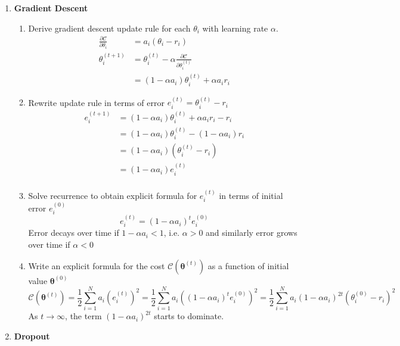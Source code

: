 \documentclass[11pt]{article}
\begin{document}
\newcommand{\bt}{\boldsymbol{\theta}}
\renewcommand{\E}[1]{\mathbb{E}\left\{#1\right\}}
\newcommand{\var}[1]{var\left\{#1\right\}}
\newcommand{\bx}{\mathbf{x}}
\newcommand{\bw}{\mathbf{w}}


\begin{enumerate}
\item \textbf{Gradient Descent}
\begin{enumerate}
    \item Derive gradient descent update rule for each $\theta_i$ with learning rate $\alpha$. 
    \begin{align*}
        \frac{\partial \mathcal{C}}{\partial \theta_i} &= a_i (\theta_i - r_i) \\
        \theta_i^{(t+1)} 
        &= \theta_i^{(t)} - \alpha \frac{\partial \mathcal{C}}{\partial \theta_i^{(t)}} \\
        &= (1-\alpha a_i)\theta_i^{(t)} + \alpha a_i r_i    
    \end{align*}
    \item Rewrite update rule in terms of error $e_i^{(t)} = \theta_i^{(t)} - r_i$
    \begin{align*}
        e_i^{(t+1)} &= (1-\alpha a_i)\theta_i^{(t)} + \alpha a_i r_i - r_i \\ 
        &= (1-\alpha a_i)\theta_i^{(t)} - (1-\alpha a_i)r_i \\
        &= (1-\alpha a_i)(\theta_i^{(t)} - r_i) \\
        &= (1-\alpha a_i) e_i^{(t)} \\ 
    \end{align*}
    \item Solve recurrence to obtain explicit formula for $e_i^{(t)}$ in terms of initial error $e_i^{(0)}$
    \[
        e_i^{(t)} = (1-\alpha a_i)^t e_i^{(0)}
    \]
    Error decays over time if $1-\alpha a_i < 1$, i.e. $\alpha > 0$ and similarly error grows over time if $\alpha < 0$ 
    \item Write an explicit formula for the cost $\mathcal{C}(\bt^{(t)})$ as a function of initial value $\bt^{(0)}$
    \[
        \mathcal{C}(\bt^{(t)}) 
        = \frac{1}{2}\sum_{i=1}^N a_i \left( e_i^{(t)} \right)^2
        = \frac{1}{2}\sum_{i=1}^N a_i \left( (1-\alpha a_i)^t e_i^{(0)} \right)^2
        = \frac{1}{2}\sum_{i=1}^N a_i \left( 1-\alpha a_i \right)^{2t} \left(\theta_i^{(0)} - r_i\right)^2
    \]
    As $t\rightarrow \infty$, the term $(1-\alpha a_i)^{2t}$ starts to dominate.
\end{enumerate}
\item \textbf{Dropout}

\end{enumerate}
\end{document}
